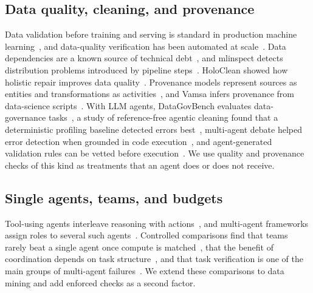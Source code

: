 \documentclass[conference]{IEEEtran}
\begin{document}
\subsection{Data quality, cleaning, and provenance}
Data validation before training and serving is standard in production machine learning~\cite{polyzotis2019datavalidation},
and data-quality verification has been automated at scale~\cite{schelter2018deequ}. Data dependencies are a known
source of technical debt~\cite{sculley2015debt}, and mlinspect detects distribution problems introduced by pipeline
steps~\cite{grafberger2021mlinspect}. HoloClean showed how holistic repair improves data quality~\cite{rekatsinas2017holoclean}.
Provenance models represent sources as entities and transformations as activities~\cite{w3c2013provdm}, and Vamsa
infers provenance from data-science scripts~\cite{namaki2020vamsa}. With LLM agents, DataGovBench evaluates
data-governance tasks~\cite{liu2025datagovbench}, a study of reference-free agentic cleaning found that a
deterministic profiling baseline detected errors best~\cite{fadlallah2026cleaning}, multi-agent debate helped error
detection when grounded in code execution~\cite{parmar2026debate}, and agent-generated validation rules can be vetted
before execution~\cite{fadlallah2026dqa}. We use quality and provenance checks of this kind as treatments that an agent
does or does not receive.

\subsection{Single agents, teams, and budgets}
Tool-using agents interleave reasoning with actions~\cite{yao2023react}, and multi-agent frameworks assign roles to
several such agents~\cite{wu2023autogen,hong2024metagpt}. Controlled comparisons find that teams rarely beat a single
agent once compute is matched~\cite{tran2026single,fu2026moreagents,dylan2026equalcost,jwalapuram2026illusion}, that
the benefit of coordination depends on task structure~\cite{kim2025scaling}, and that task verification is one of the
main groups of multi-agent failures~\cite{cemri2025mas}. We extend these comparisons to data mining and add enforced
checks as a second factor.
\end{document}

